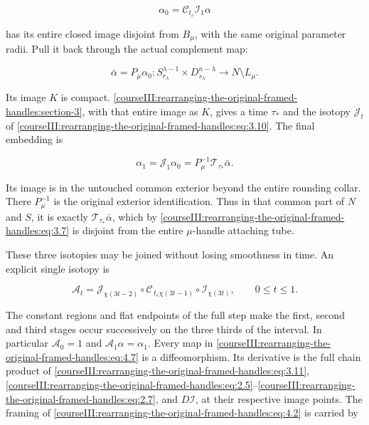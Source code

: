 \begin{equation}
\alpha_0=\mathcal C_{t_c}\mathcal I_1\alpha
\label{courseIII:rearranging-the-original-framed-handles:eq:4.4}
\end{equation}

has its entire closed image disjoint from \(B_\mu\), with the same original parameter radii. Pull it back through the actual complement map:

\begin{equation}
\bar\alpha=P_\mu\alpha_0:
S_{r_\lambda}^{\lambda-1}\times D_{s_\lambda}^{n-\lambda}
\longrightarrow N\setminus L_\mu.
\label{courseIII:rearranging-the-original-framed-handles:eq:4.5}
\end{equation}

Its image \(K\) is compact. \cref{courseIII:rearranging-the-original-framed-handles:section-3}, with that entire image as \(K\), gives a time \(\tau_*\) and the isotopy \(\mathcal J_t\) of \eqref{courseIII:rearranging-the-original-framed-handles:eq:3.10}. The final embedding is

\begin{equation}
\alpha_1=\mathcal J_1\alpha_0
=P_\mu^{-1}\mathcal T_{\tau_*}\bar\alpha.
\label{courseIII:rearranging-the-original-framed-handles:eq:4.6}
\end{equation}

Its image is in the untouched common exterior beyond the entire rounding collar. There \(P_\mu^{-1}\) is the original exterior identification. Thus in that common part of \(N\) and \(S\), it is exactly \(\mathcal T_{\tau_*}\bar\alpha\), which by \eqref{courseIII:rearranging-the-original-framed-handles:eq:3.7} is disjoint from the entire \(\mu\)-handle attaching tube.

These three isotopies may be joined without losing smoothness in time. An explicit single isotopy is

\begin{equation}
\mathcal A_t
=\mathcal J_{\chi(3t-2)}
 \circ\mathcal C_{\,t_c\chi(3t-1)}
 \circ\mathcal I_{\chi(3t)},
\qquad 0\leq t\leq1.
\label{courseIII:rearranging-the-original-framed-handles:eq:4.7}
\end{equation}

The constant regions and flat endpoints of the full step make the first, second and third stages occur successively on the three thirds of the interval. In particular \(\mathcal A_0=1\) and \(\mathcal A_1\alpha=\alpha_1\). Every map in \eqref{courseIII:rearranging-the-original-framed-handles:eq:4.7} is a diffeomorphism. Its derivative is the full chain product of \eqref{courseIII:rearranging-the-original-framed-handles:eq:3.11}, \eqref{courseIII:rearranging-the-original-framed-handles:eq:2.5}--\eqref{courseIII:rearranging-the-original-framed-handles:eq:2.7}, and \(D\mathcal I\), at their respective image points. The framing of \eqref{courseIII:rearranging-the-original-framed-handles:eq:4.2} is carried by

